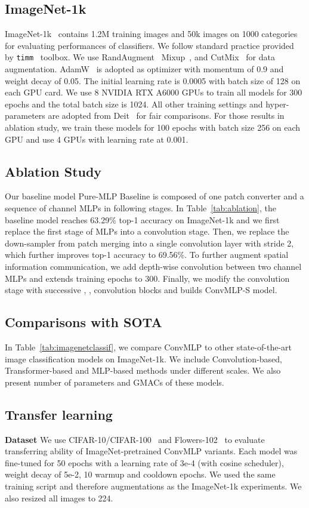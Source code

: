 \documentclass[final]{cvpr}
\begin{document}
\subsection{ImageNet-1k}
ImageNet-1k~\cite{krizhevsky2012imagenet} contains 1.2M training images and 50k images on 1000 categories for evaluating performances of classifiers. We follow standard practice provided by \verb|timm|~\cite{rw2019timm} toolbox. We use RandAugment~\cite{cubuk2020randaugment} Mixup~\cite{zhang2017mixup}, and CutMix~\cite{yun2019cutmix} for data augmentation. AdamW~\cite{loshchilov2017decoupled} is adopted as optimizer with momentum of 0.9 and weight decay of 0.05. The initial learning rate is 0.0005 with batch size of 128 on each GPU card. We use 8 NVIDIA RTX A6000 GPUs to train all models for 300 epochs and the total batch size is 1024. All other training settings and hyper-parameters are adopted from Deit~\cite{touvron2021training} for fair comparisons. For those results in ablation study, we train these models for 100 epochs with batch size 256 on each GPU and use 4 GPUs with learning rate at 0.001.

\subsection{Ablation Study}
Our baseline model Pure-MLP Baseline is composed of one patch converter and a sequence of channel MLPs in following stages. In Table~\ref{tab:ablation}, the baseline model reaches 63.29\% top-1 accuracy on ImageNet-1k and we first replace the first stage of MLPs into a convolution stage. Then, we replace the down-sampler from patch merging into a single  convolution layer with stride 2, which further improves top-1 accuracy to 69.56\%. To further augment spatial information communication, we add  depth-wise convolution between two channel MLPs and extends training epochs to 300. Finally, we modify the convolution stage with successive , ,  convolution blocks and builds ConvMLP-S model. 

\subsection{Comparisons with SOTA}
In Table~\ref{tab:imagenetclassif}, we compare ConvMLP to other state-of-the-art image classification models on ImageNet-1k. We include Convolution-based, Transformer-based and MLP-based methods under different scales. We also present number of parameters and GMACs of these models. 

\subsection{Transfer learning}
\noindent \textbf{Dataset} We use CIFAR-10/CIFAR-100~\cite{krizhevsky2009learning} and Flowers-102~\cite{nilsback2008automated} to evaluate transferring ability of ImageNet-pretrained ConvMLP variants. Each model was fine-tuned for 50 epochs with a learning rate of 3e-4 (with cosine scheduler), weight decay of 5e-2, 10 warmup and cooldown epochs. We used the same training script and therefore augmentations as the ImageNet-1k experiments. We also resized all images to 224.
\end{document}
